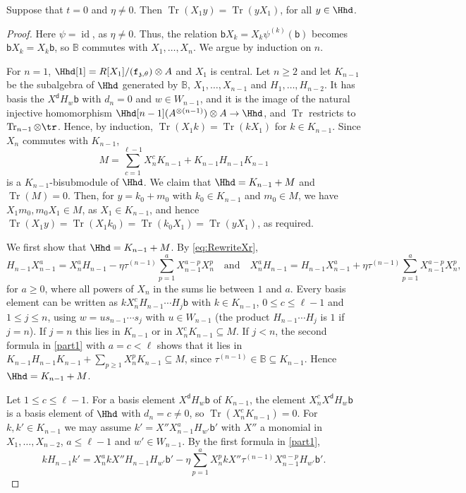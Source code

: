 \documentclass[a4paper,11pt]{amsart}
\newcommand{\Tr}{\op{Tr}}
\numberwithin{equation}{subsection}
\theoremstyle{definition}
\theoremstyle{theorem}
\theoremstyle{remark}
\newcommand\charge{{\mathfrak{z}}}
\newcommand\fct{\mathtt{f}_{\charge,\theta}}
\newcommand\Sym{W}
\newcommand\Kr[1]{K_{#1}}
\newcommand\bd{\mathsf{d}}
\newcommand\bb{\mathsf{b}}
\newcommand\op{\operatorname}
\newcommand\taui[1][i]{\tau^{(#1)}}
\newcommand{\Bo}{\mathbb{B}}
\begin{document}
\begin{Lemma}\label{L:XoneTZero}
Suppose that $t=0$ and $\eta\ne0$. Then $\Tr(X_1y)=\Tr(yX_1)$, for all $y\in\Hhd$.
\end{Lemma}
\begin{proof}
Here $\psi=\op{id}$, as $\eta\neq0$. Thus, the relation $\bb
X_k=X_k\psi^{(k)}(\bb)$ becomes $\bb X_k=X_k\bb$, so $\Bo$ commutes with
$X_1,\dots,X_n$.
 We argue by induction on $n$.

 For $n=1$, $\Hhd[1]=R[X_1]/(\fct)\otimes A$ and $X_1$ is central. Let $n\geq2$ and let $\Kr{n-1}$ be the subalgebra of $\Hhd$ generated by $\Bo$, $X_1,\dots,X_{n-1}$ and $H_1,\dots,H_{n-2}$. It has basis the $X^\bd H_w\bb$ with $d_n=0$ and $w\in\Sym_{n-1}$, and it is the image of the natural injective homomorphism $\Hhd[n-1](A^{\otimes(n-1)})\otimes A\to\Hhd$, and $\Tr$ restricts to $\Tr_{n-1}\otimes\tr$. Hence, by induction, $\Tr(X_1k)=\Tr(kX_1)$ for $k\in\Kr{n-1}$. Since $X_n$ commutes with $\Kr{n-1}$,
\[
 M=\sum_{c=1}^{\ell-1}X_n^c\Kr{n-1}+\Kr{n-1}H_{n-1}\Kr{n-1}
\]
is a $\Kr{n-1}$-bisubmodule of $\Hhd$. We claim that $\Hhd=\Kr{n-1}+M$ and $\Tr(M)=0$. Then, for $y=k_0+m_0$ with $k_0\in\Kr{n-1}$ and $m_0\in M$, we have $X_1m_0,m_0X_1\in M$, as $X_1\in\Kr{n-1}$, and hence $\Tr(X_1y)=\Tr(X_1k_0)=\Tr(k_0X_1)=\Tr(yX_1)$, as required.

We first show that $\Hhd=\Kr{n-1}+M$. By \autoref{eq:RewriteXr},
\begin{equation}\label{part1}
 H_{n-1}X_{n-1}^a=X_n^aH_{n-1}-\eta\taui[n-1]\sum_{p=1}^{a}X_{n-1}^{a-p}X_n^p\quad\text{and}\quad
 X_n^aH_{n-1}=H_{n-1}X_{n-1}^a+\eta\taui[n-1]\sum_{p=1}^{a}X_{n-1}^{a-p}X_n^p,
\end{equation}
for $a\geq0$, where all powers of $X_n$ in the sums lie between $1$ and $a$. Every basis element can be written as $kX_n^cH_{n-1}\cdots H_j\bb$ with $k\in\Kr{n-1}$, $0\leq c\leq\ell-1$ and $1\leq j\leq n$, using $w=us_{n-1}\cdots s_j$ with $u\in\Sym_{n-1}$ (the product $H_{n-1}\cdots H_j$ is $1$ if $j=n$). If $j=n$ this lies in $\Kr{n-1}$ or in $X_n^c\Kr{n-1}\subseteq M$. If $j<n$, the second formula in \autoref{part1} with $a=c<\ell$ shows that it lies in $\Kr{n-1}H_{n-1}\Kr{n-1}+\sum_{p\geq1}X_n^p\Kr{n-1}\subseteq M$, since $\taui[n-1]\in\Bo\subseteq\Kr{n-1}$. Hence $\Hhd=\Kr{n-1}+M$.

Let $1\le c\le\ell-1$. For a basis element $X^\bd H_w\bb$ of $\Kr{n-1}$, the element $X_n^cX^\bd H_w\bb$ is a basis element of $\Hhd$ with $d_n=c\neq0$, so $\Tr(X_n^c\Kr{n-1})=0$. For $k,k'\in\Kr{n-1}$ we may assume $k'=X''X_{n-1}^aH_{w'}\bb'$ with $X''$ a monomial in $X_1,\dots,X_{n-2}$, $a\leq\ell-1$ and $w'\in\Sym_{n-1}$. By the first formula in \autoref{part1},
\[
 kH_{n-1}k'=X_n^akX''H_{n-1}H_{w'}\bb'-\eta\sum_{p=1}^{a}X_n^pkX''\taui[n-1]X_{n-1}^{a-p}H_{w'}\bb'.
\]


\end{proof}
\end{document}
